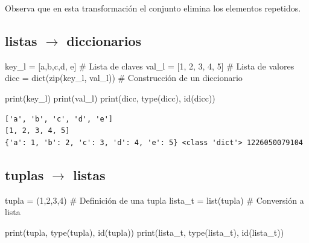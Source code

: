 \documentclass[
  spanish,
  letterpaper,
]{scrbook}
\newenvironment{Shaded}{\begin{snugshade}}{\end{snugshade}}
\newcommand{\BuiltInTok}[1]{\textcolor[rgb]{0.00,0.23,0.31}{#1}}
\newcommand{\CommentTok}[1]{\textcolor[rgb]{0.37,0.37,0.37}{#1}}
\newcommand{\DecValTok}[1]{\textcolor[rgb]{0.68,0.00,0.00}{#1}}
\newcommand{\NormalTok}[1]{\textcolor[rgb]{0.00,0.23,0.31}{#1}}
\newcommand{\OperatorTok}[1]{\textcolor[rgb]{0.37,0.37,0.37}{#1}}
\newcommand{\StringTok}[1]{\textcolor[rgb]{0.13,0.47,0.30}{#1}}
\theoremstyle{definition}
\theoremstyle{remark}
\begin{document}
Observa que en esta transformación el conjunto elimina los elementos
repetidos.

\subsection{\texorpdfstring{listas \(\to\)
diccionarios}{listas \textbackslash to diccionarios}}\label{listas-to-diccionarios}

\begin{Shaded}
\begin{Highlighting}[]
\NormalTok{key\_l }\OperatorTok{=}\NormalTok{ [}\StringTok{\textquotesingle{}a\textquotesingle{}}\NormalTok{,}\StringTok{\textquotesingle{}b\textquotesingle{}}\NormalTok{,}\StringTok{\textquotesingle{}c\textquotesingle{}}\NormalTok{,}\StringTok{\textquotesingle{}d\textquotesingle{}}\NormalTok{, }\StringTok{\textquotesingle{}e\textquotesingle{}}\NormalTok{] }\CommentTok{\# Lista de claves}
\NormalTok{val\_l }\OperatorTok{=}\NormalTok{ [}\DecValTok{1}\NormalTok{, }\DecValTok{2}\NormalTok{, }\DecValTok{3}\NormalTok{, }\DecValTok{4}\NormalTok{, }\DecValTok{5}\NormalTok{]        }\CommentTok{\# Lista de valores}
\NormalTok{dicc }\OperatorTok{=} \BuiltInTok{dict}\NormalTok{(}\BuiltInTok{zip}\NormalTok{(key\_l, val\_l)) }\CommentTok{\# Construcción de un diccionario}

\BuiltInTok{print}\NormalTok{(key\_l)}
\BuiltInTok{print}\NormalTok{(val\_l)}
\BuiltInTok{print}\NormalTok{(dicc, }\BuiltInTok{type}\NormalTok{(dicc), }\BuiltInTok{id}\NormalTok{(dicc))}
\end{Highlighting}
\end{Shaded}

\begin{verbatim}
['a', 'b', 'c', 'd', 'e']
[1, 2, 3, 4, 5]
{'a': 1, 'b': 2, 'c': 3, 'd': 4, 'e': 5} <class 'dict'> 1226050079104
\end{verbatim}

\subsection{\texorpdfstring{tuplas \(\to\)
listas}{tuplas \textbackslash to listas}}\label{tuplas-to-listas}

\begin{Shaded}
\begin{Highlighting}[]
\NormalTok{tupla }\OperatorTok{=}\NormalTok{ (}\DecValTok{1}\NormalTok{,}\DecValTok{2}\NormalTok{,}\DecValTok{3}\NormalTok{,}\DecValTok{4}\NormalTok{)     }\CommentTok{\# Definición de una tupla}
\NormalTok{lista\_t }\OperatorTok{=} \BuiltInTok{list}\NormalTok{(tupla) }\CommentTok{\# Conversión a lista}

\BuiltInTok{print}\NormalTok{(tupla, }\BuiltInTok{type}\NormalTok{(tupla), }\BuiltInTok{id}\NormalTok{(tupla))}
\BuiltInTok{print}\NormalTok{(lista\_t, }\BuiltInTok{type}\NormalTok{(lista\_t), }\BuiltInTok{id}\NormalTok{(lista\_t))}
\end{Highlighting}
\end{Shaded}
\end{document}
